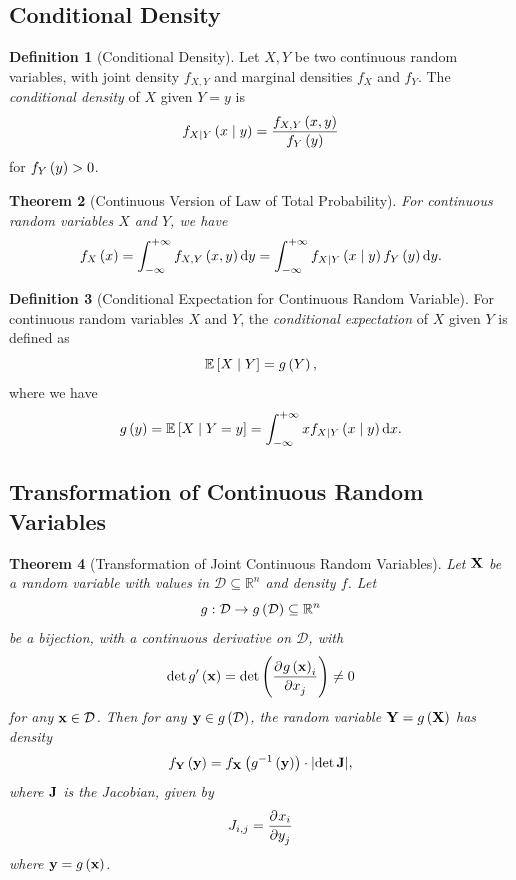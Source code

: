\documentclass{article}
\newtheorem{theorem}{Theorem}[section]
\theoremstyle{definition}
\newtheorem{definition}[theorem]{Definition}
\theoremstyle{remark}
\DeclarePairedDelimiter{\abs}{\lvert}{\rvert}
\newcommand{\RR}{\mathbb{R}}
\newcommand{\Expt}{\mathbb{E}}
\newcommand{\Conditional}[2]{#1\mid #2}
\newcommand{\inverse}{^{-1}}
\newcommand{\plusinfty}{+\infty}
\newcommand{\minusinfty}{-\infty}
\newcommand{\functiondomain}[3]{#1:#2\to #3}
\newcommand{\bound}[1]{{#1}}
\begin{document}
\subsection{Conditional Density}

\begin{definition}[Conditional Density]
    \label{def:conditional-density}%
    Let \(X, Y\) be two continuous random variables, with joint density \(f_{X, Y}\) and marginal densities \(f_{X}\) and \(f_{Y}\). The \emph{conditional density} of \(X\) given \(Y = y\) is
    \[
        f_{\bound{\Conditional{X}{Y}}} \pqty{\Conditional{x}{y}} = \frac{f_{X, Y}\pqty{x, y}}{f_Y\pqty{y}}
    \]
    for \(f_Y\left(y\right) > 0\).
\end{definition}

\begin{theorem}[Continuous Version of Law of Total Probability]
    \label{thm:cont-law-total-prob}%
    For continuous random variables \(X\) and \(Y\), we have
    \[
        f_X\pqty{x} = \int_{\minusinfty}^{\plusinfty} f_{X, Y} \pqty{x, y} \dd{y} = \int_{\minusinfty}^{\plusinfty} f_{\bound{\Conditional{X}{Y}}} \pqty{\Conditional{x}{y}} f_Y\pqty{y} \dd{y}.
    \]
\end{theorem}

\begin{definition}[Conditional Expectation for Continuous Random Variable]
    \label{def:conditional-expectation-crv}%
    For continuous random variables \(X\) and \(Y\), the \emph{conditional expectation} of \(X\) given \(Y\) is defined as
    \[
        \Expt\bqty{\Conditional{X}{Y}} = g\pqty{Y},
    \]
    where we have
    \[
        g\pqty{y} = \Expt\bqty{\Conditional{X}{Y = y}} = \int_{\minusinfty}^{\plusinfty} x f_{\bound{\Conditional{X}{Y}}} \pqty{\Conditional{x}{y}} \dd{x}.
    \]
\end{definition}

\subsection{Transformation of Continuous Random Variables}

\begin{theorem}[Transformation of Joint Continuous Random Variables]
    \label{thm:transformation-joint-continuous-random-variable}%
    Let \(\vb{X}\) be a random variable with values in \(\mathcal{D} \subseteq \RR^n\) and density \(f\). Let
    \[
        \functiondomain{g}{\mathcal{D}}{g\pqty{\mathcal{D}} \subseteq \RR^n}
    \]
    be a bijection, with a continuous derivative on \(\mathcal{D}\), with
    \[
        \det g'\pqty{\vb{x}} = \det \pqty{\pdv{g\pqty{\vb{x}}_i}{x_j}} \neq 0
    \]
    for any \(\vb{x} \in \mathcal{D}\). Then for any \(\vb{y} \in g\pqty{\mathcal{D}}\), the random variable \(\vb{Y} = g\pqty{\vb{X}}\) has density
    \[
        f_{\vb{Y}}\pqty{\vb{y}} = f_{\vb{X}} \pqty{g\inverse\pqty{\vb{y}}} \cdot \abs{\det \vb{J}},
    \]
    where \(\vb{J}\) is the \emph{Jacobian}, given by
    \[
        J_{i, j} = \pdv{x_i}{y_j}
    \]
    where \(\vb{y} = g\pqty{\vb{x}}\).
\end{theorem}
\end{document}
